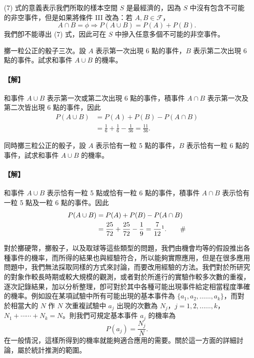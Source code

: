 (7) 式的意義表示我們所取的樣本空間 $S$ 是最經濟的，因為 $S$ 中沒有包含不可能的非空事件，但是如果將條件 III 改為：若 $A, B \in \mathscr{F}$，
\[
A \cap B = \phi \Longrightarrow P(A \cup B) = P(A) + P(B).
\]
我們卽不能導出 (7) 式，因此可在 $S$ 中摻入任意多個不可能的非空事件。

\medskip
\begin{example}\label{ex:b5s-4-2}
擲一粒公正的骰子三次。設 $A$ 表示第一次出現 6 點的事件，$B$ 表示第二次出現 6 點的事件。試求和事件 $A \cup B$ 的機率。
\end{example}
\paragraph{【解】}
和事件 $A \cup B$ 表示第一次或第二次出現 6 點的事件，積事件 $A \cap B$ 表示第一次及第二次皆出現 6 點的事件，因此
\begin{align*}
P(A \cup B) &= P(A) + P(B) - P(A \cap B) \\
&= \frac{1}{6} + \frac{1}{6} - \frac{1}{36} = \frac{11}{36}. \tag*{\#}
\end{align*}

\medskip
\begin{example}\label{ex:b5s-4-3}
同時擲三粒公正的骰子，設 $A$ 表示恰有一粒 5 點的事件，$B$ 表示恰有一粒 6 點的事件，試求和事件 $A \cup B$ 的機率。
\end{example}
\paragraph{【解】}
和事件 $A \cup B$ 表示恰有一粒 5 點或恰有一粒 6 點的事件，積事件 $A \cap B$ 表示恰有一粒 5 點及一粒 6 點的事件。因此
\label{note:b5s-ch4-p121-calc}
\begin{align*}
P(A \cup B) &= P(A) + P(B) - P(A \cap B) \\
&= \frac{25}{72} + \frac{25}{72} - \frac{1}{9} = \frac{7}{12}\footnotemark. \tag*{\#}
\end{align*}

對於擲硬幣，擲骰子，以及取球等這些類型的問題，我們由機會均等的假設推出各種事件的機率，而所得的結果也與經驗符合，所以能夠實際應用，但是在很多應用問題中，我們無法採取同樣的方式來討論，而要改用經驗的方法。我們對於所研究的對象作較長時期或較大規模的觀測，或者對於所進行的實驗作較多次數的重複，逐次記錄結果，加以分析整理，卽可對於其中各種可能出現事件給定相當程度準確的機率。例如設在某項試驗中所有可能出現的基本事件為 $\{a_1, a_2, \dots\dots, a_k\}$，而對於相當大的 $N$ 作 $N$ 次重複試驗中 $a_j$ 出現的次數為 $N_j$，$j = 1, 2, \dots\dots, k$，$N_1 + \cdots\cdots + N_k = N$。則我們可規定基本事件 $a_j$ 的機率為
\[
P(a_j) = \frac{N_j}{N}.
\]
在一般情況，這樣所得到的機率就能夠適合應用的需要。關於這一方面的詳細討論，屬於統計推測的範圍。

